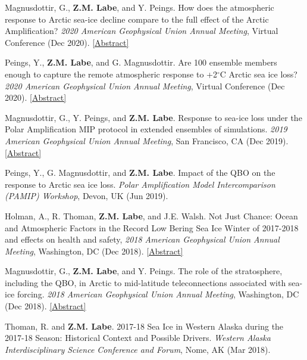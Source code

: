 \documentclass[margin,line,palatino,courier,10pt]{res}
\begin{document}
\begin{resume}
\begin{etaremune}[leftmargin=0in,topsep=0in,parsep=0in]
\item Magnusdottir, G., \textbf{Z.M. Labe}, and Y. Peings. How does the atmospheric response to Arctic sea-ice decline compare to the full effect of the Arctic Amplification? \textit{2020 American Geophysical Union Annual Meeting}, Virtual Conference (Dec 2020). \href{https://agu.confex.com/agu/fm20/meetingapp.cgi/Paper/678706}{[Abstract]}
\item Peings, Y., \textbf{Z.M. Labe}, and G. Magnusdottir. Are 100 ensemble members enough to capture the remote atmospheric response to +2$^{\circ}$C Arctic sea ice loss? \textit{2020 American Geophysical Union Annual Meeting}, Virtual Conference (Dec 2020). \href{https://agu.confex.com/agu/fm20/meetingapp.cgi/Paper/685885}{[Abstract]}
\item Magnusdottir, G., Y. Peings, and \textbf{Z.M. Labe}. Response to sea-ice loss under the Polar Amplification MIP protocol in extended ensembles of simulations. \textit{2019 American Geophysical Union Annual Meeting}, San Francisco, CA (Dec 2019). \href{https://agu.confex.com/agu/fm19/meetingapp.cgi/Paper/553470}{[Abstract]}
\item Peings, Y., G. Magnusdottir, and \textbf{Z.M. Labe}. Impact of the QBO on the response to Arctic sea ice loss. \textit{Polar Amplification Model Intercomparison (PAMIP) Workshop}, Devon, UK (Jun 2019).
\item Holman, A., R. Thoman, \textbf{Z.M. Labe}, and J.E. Walsh. Not Just Chance: Ocean and Atmospheric Factors in the Record Low Bering Sea Ice Winter of 2017-2018 and effects on health and safety, \textit{2018 American Geophysical Union Annual Meeting}, Washington, DC (Dec 2018). \href{https://agu.confex.com/agu/fm18/meetingapp.cgi/Paper/451295}{[Abstract]}
\item Magnusdottir, G., \textbf{Z.M. Labe}, and Y. Peings. The role of the stratosphere, including the QBO, in Arctic to mid-latitude teleconnections associated with sea-ice forcing. \textit{2018 American Geophysical Union Annual Meeting}, Washington, DC (Dec 2018). \href{https://agu.confex.com/agu/fm18/meetingapp.cgi/Paper/399117}{[Abstract]}
\item Thoman, R. and \textbf{Z.M. Labe}. 2017-18 Sea Ice in Western Alaska during the 2017-18 Season: Historical Context and Possible Drivers. \textit{Western Alaska Interdisciplinary Science Conference and Forum}, Nome, AK (Mar 2018). 

\end{etaremune}

\vspace{-0.1in}
\noindent\textcolor{Cerulean}{\makebox[\linewidth][r]{\rule{\textwidth}{5pt}}}
\vspace{-0.3in}


\end{resume}
\end{document}
